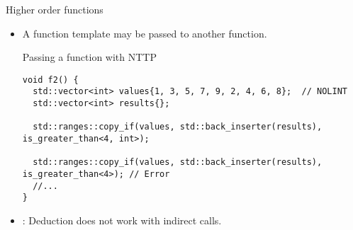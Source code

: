 \begin{frame}[t,fragile]{Higher order functions}
\begin{itemize}
  \item A function template may be passed to another function.

\begin{block}{Passing a function with NTTP}
\begin{lstlisting}
void f2() {
  std::vector<int> values{1, 3, 5, 7, 9, 2, 4, 6, 8};  // NOLINT
  std::vector<int> results{};

  std::ranges::copy_if(values, std::back_inserter(results), is_greater_than<4, int>);

  std::ranges::copy_if(values, std::back_inserter(results), is_greater_than<4>); // Error
  //...
}
\end{lstlisting}
\end{block}

  \item {}: Deduction does not work with indirect calls.

\end{itemize}
\end{frame}

